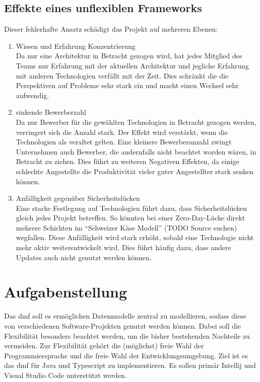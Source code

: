 \documentclass[./einleitung.tex]{subfiles}
\begin{document}
\subsection{Effekte eines unflexiblen Frameworks}
Dieser fehlerhafte Ansatz schädigt das Projekt auf mehreren Ebenen:
\begin{enumerate}
\item Wissen und Erfahrung Konzentrierung \\
Da nur eine Architektur in Betracht gezogen wird, hat jedes Mitglied des Teams nur Erfahrung mit der aktuellen Architektur und jegliche Erfahrung mit anderen Technologien verfällt mit der Zeit. Dies schränkt die die Perspektiven auf Probleme sehr stark ein und macht einen Wechsel sehr aufwendig.
\item sinkende Bewerberzahl \\
Da nur Bewerber für die gewählten Technologien in Betracht gezogen werden, verringert sich die Anzahl stark.
Der Effekt wird verstärkt, wenn die Technologien als veraltet gelten.
Eine kleinere Bewerberanzahl zwingt Unternehmen auch Bewerber, die andernfalls nicht beachtet worden wären, in Betracht zu ziehen.
Dies führt zu weiteren Negativen Effekten, da einige schlechte Angestellte die Produktivität vieler guter Angestellter stark senken können.
\item Anfälligkeit gegenüber Sicherheitslücken \\
Eine starke Festlegung auf Technologien führt dazu, dass Sicherheitslücken gleich jedes Projekt betreffen.
So könnten bei einer Zero-Day-Lücke direkt mehrere Schichten im ``Schweizer Käse Modell'' (TODO Source suchen) wegfallen.
Diese Anfälligkeit wird stark erhöht, sobald eine Technologie nicht mehr aktiv weiterentwickelt wird.
Dies führt häufig dazu, dass andere Updates auch nicht genutzt werden können.
\end{enumerate}

\section{Aufgabenstellung}
Das \acrfull{dmf} soll es ermöglichen Datenmodelle zentral zu modellieren, sodass diese von verschiedenen Software-Projekten genutzt werden können.
Dabei soll die Flexibilität besonders beachtet werden, um die bisher bestehenden Nachteile zu vermeiden.
Zur Flexibilität gehört die (möglichst) freie Wahl der Programmiersprache und die freie Wahl der Entwicklungsumgebung.
\newline
Ziel ist es das \acrshort{dmf} für Java und Typescript zu implementieren.
Es sollen primär Intellij und Visual Studio Code unterstützt werden.
\end{document}
